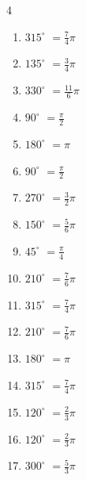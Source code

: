 \begin{multicols}{4}
\begin{enumerate}
  \item $\displaystyle 315^{\circ}$
        $\displaystyle =\frac{7}{4}\pi$

  \item $\displaystyle 135^{\circ}$
        $\displaystyle =\frac{3}{4}\pi$

  \item $\displaystyle 330^{\circ}$
        $\displaystyle =\frac{11}{6}\pi$

  \item $\displaystyle 90^{\circ}$
        $\displaystyle =\frac{\pi}{2}$

  \item $\displaystyle 180^{\circ}$
        $\displaystyle =\pi$

  \item $\displaystyle 90^{\circ}$
        $\displaystyle =\frac{\pi}{2}$

  \item $\displaystyle 270^{\circ}$
        $\displaystyle =\frac{3}{2}\pi$

  \item $\displaystyle 150^{\circ}$
        $\displaystyle =\frac{5}{6}\pi$

  \item $\displaystyle 45^{\circ}$
        $\displaystyle =\frac{\pi}{4}$

  \item $\displaystyle 210^{\circ}$
        $\displaystyle =\frac{7}{6}\pi$

  \item $\displaystyle 315^{\circ}$
        $\displaystyle =\frac{7}{4}\pi$

  \item $\displaystyle 210^{\circ}$
        $\displaystyle =\frac{7}{6}\pi$

  \item $\displaystyle 180^{\circ}$
        $\displaystyle =\pi$

  \item $\displaystyle 315^{\circ}$
        $\displaystyle =\frac{7}{4}\pi$

  \item $\displaystyle 120^{\circ}$
        $\displaystyle =\frac{2}{3}\pi$

  \item $\displaystyle 120^{\circ}$
        $\displaystyle =\frac{2}{3}\pi$

  \item $\displaystyle 300^{\circ}$
        $\displaystyle =\frac{5}{3}\pi$


\end{enumerate}
\end{multicols}
